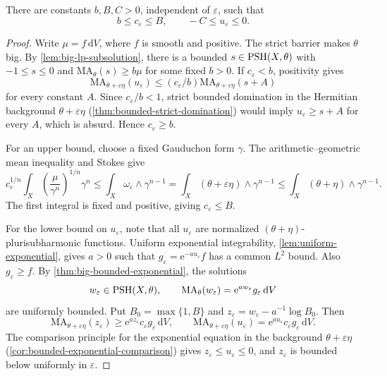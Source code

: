 \begin{lemma}\label{lem:degeneration-potential-bound}
There are constants $b,B,C>0$, independent of $\varepsilon$, such that
\[
 b\leq c_\varepsilon\leq B,
 \qquad -C\leq u_\varepsilon\leq0.
\]
\end{lemma}
\begin{proof}
Write $\mu=f\,\mathrm{d}V$, where $f$ is smooth and positive. The strict barrier makes $\theta$ big. By \cref{lem:big-lp-subsolution}, there is a bounded $s\in\mathrm{PSH}(X,\theta)$ with $-1\leq s\leq0$ and $\mathrm{MA}_\theta(s)\geq b\mu$ for some fixed $b>0$. If $c_\varepsilon<b$, positivity gives
\[
 \mathrm{MA}_{\theta+\varepsilon\eta}(u_\varepsilon)
 \leq(c_\varepsilon/b)\mathrm{MA}_{\theta+\varepsilon\eta}(s+A)
\]
for every constant $A$. Since $c_\varepsilon/b<1$, strict bounded domination in the Hermitian background $\theta+\varepsilon\eta$ (\cref{thm:bounded-strict-domination}) would imply $u_\varepsilon\geq s+A$ for every $A$, which is absurd. Hence $c_\varepsilon\geq b$.

For an upper bound, choose a fixed Gauduchon form $\gamma$. The arithmetic--geometric mean inequality and Stokes give
\[
 c_\varepsilon^{1/n}
 \int_X\left(\frac{\mu}{\gamma^n}\right)^{1/n}\gamma^n
 \leq\int_X\omega_\varepsilon\wedge\gamma^{n-1}
 =\int_X(\theta+\varepsilon\eta)\wedge\gamma^{n-1}
 \leq\int_X(\theta+\eta)\wedge\gamma^{n-1}.
\]
The first integral is fixed and positive, giving $c_\varepsilon\leq B$.

For the lower bound on $u_\varepsilon$, note that all $u_\varepsilon$ are normalized $(\theta+\eta)$-plurisubharmonic functions. Uniform exponential integrability, \cref{lem:uniform-exponential}, gives $a>0$ such that $g_\varepsilon=\mathrm{e}^{-a u_\varepsilon}f$ has a common $L^2$ bound. Also $g_\varepsilon\geq f$. By \cref{thm:big-bounded-exponential}, the solutions
\[
 w_\varepsilon\in\mathrm{PSH}(X,\theta),
 \qquad \mathrm{MA}_\theta(w_\varepsilon)
       =\mathrm{e}^{a w_\varepsilon}g_\varepsilon\,\mathrm{d}V
\]
are uniformly bounded. Put $B_0=\max\{1,B\}$ and $z_\varepsilon=w_\varepsilon-a^{-1}\log B_0$. Then
\[
 \mathrm{MA}_{\theta+\varepsilon\eta}(z_\varepsilon)
 \geq \mathrm{e}^{a z_\varepsilon}c_\varepsilon g_\varepsilon\,\mathrm{d}V,
 \qquad
 \mathrm{MA}_{\theta+\varepsilon\eta}(u_\varepsilon)
 =\mathrm{e}^{a u_\varepsilon}c_\varepsilon g_\varepsilon\,\mathrm{d}V.
\]
The comparison principle for the exponential equation in the background $\theta+\varepsilon\eta$ (\cref{cor:bounded-exponential-comparison}) gives $z_\varepsilon\leq u_\varepsilon\leq0$, and $z_\varepsilon$ is bounded below uniformly in $\varepsilon$.
\end{proof}

